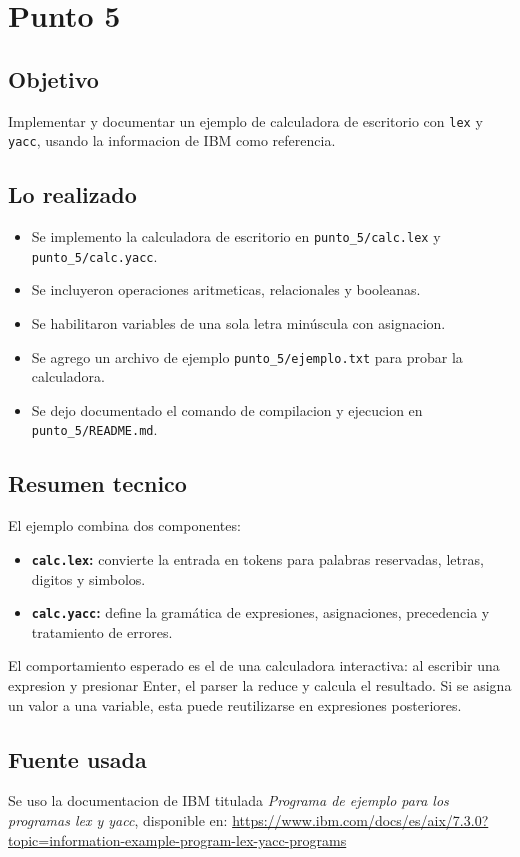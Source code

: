 \documentclass[12pt,a4paper]{article}
\begin{document}
\section{Punto 5}
\subsection*{Objetivo}
Implementar y documentar un ejemplo de calculadora de escritorio con \texttt{lex} y \texttt{yacc}, usando la informacion de IBM como referencia.

\subsection*{Lo realizado}
\begin{itemize}
    \item Se implemento la calculadora de escritorio en \texttt{punto\_5/calc.lex} y \texttt{punto\_5/calc.yacc}.
    \item Se incluyeron operaciones aritmeticas, relacionales y booleanas.
    \item Se habilitaron variables de una sola letra min\'uscula con asignacion.
    \item Se agrego un archivo de ejemplo \texttt{punto\_5/ejemplo.txt} para probar la calculadora.
    \item Se dejo documentado el comando de compilacion y ejecucion en \texttt{punto\_5/README.md}.
\end{itemize}

\subsection*{Resumen tecnico}
El ejemplo combina dos componentes:
\begin{itemize}
    \item \textbf{\texttt{calc.lex}:} convierte la entrada en tokens para palabras reservadas, letras, digitos y simbolos.
    \item \textbf{\texttt{calc.yacc}:} define la gram\'atica de expresiones, asignaciones, precedencia y tratamiento de errores.
\end{itemize}

El comportamiento esperado es el de una calculadora interactiva: al escribir una expresion y presionar Enter, el parser la reduce y calcula el resultado. Si se asigna un valor a una variable, esta puede reutilizarse en expresiones posteriores.

\subsection*{Fuente usada}
Se uso la documentacion de IBM titulada \textit{Programa de ejemplo para los programas lex y yacc}, disponible en: \url{https://www.ibm.com/docs/es/aix/7.3.0?topic=information-example-program-lex-yacc-programs}
\end{document}
